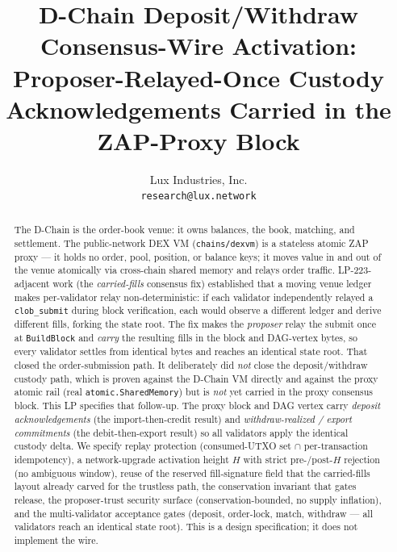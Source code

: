 \documentclass[11pt,a4paper]{article}
\title{D-Chain Deposit/Withdraw Consensus-Wire Activation:\\
       Proposer-Relayed-Once Custody Acknowledgements
       Carried in the ZAP-Proxy Block}
\author{Lux Industries, Inc. \\
        \texttt{research@lux.network}}
\date{}
\begin{document}
\luxcoverpage

\begin{abstract}
The D-Chain is the order-book venue: it owns balances, the book,
matching, and settlement. The public-network DEX VM
(\texttt{chains/dexvm}) is a stateless atomic ZAP proxy --- it holds
no order, pool, position, or balance keys; it moves value in and out
of the venue atomically via cross-chain shared memory and relays
order traffic. LP-223-adjacent work (the \emph{carried-fills}
consensus fix) established that a moving venue ledger makes
per-validator relay non-deterministic: if each validator independently
relayed a \texttt{clob\_submit} during block verification, each would
observe a different ledger and derive different fills, forking the
state root. The fix makes the \emph{proposer} relay the submit once at
\texttt{BuildBlock} and \emph{carry} the resulting fills in the block
and DAG-vertex bytes, so every validator settles from identical bytes
and reaches an identical state root. That closed the order-submission
path. It deliberately did \emph{not} close the deposit/withdraw
custody path, which is proven against the D-Chain VM directly and
against the proxy atomic rail (real \texttt{atomic.SharedMemory}) but
is \emph{not} yet carried in the proxy consensus block. This LP
specifies that follow-up. The proxy block and DAG vertex carry
\emph{deposit acknowledgements} (the import-then-credit result) and
\emph{withdraw-realized / export commitments} (the debit-then-export
result) so all validators apply the identical custody delta. We
specify replay protection (consumed-UTXO set $\cap$ per-transaction
idempotency), a network-upgrade activation height $H$ with strict
pre-/post-$H$ rejection (no ambiguous window), reuse of the reserved
fill-signature field that the carried-fills layout already carved for
the trustless path, the conservation invariant that gates release, the
proposer-trust security surface (conservation-bounded, no supply
inflation), and the multi-validator acceptance gates (deposit,
order-lock, match, withdraw --- all validators reach an identical state
root). This is a design specification; it does not implement the wire.
\end{abstract}

\tableofcontents
\newpage









\end{document}
